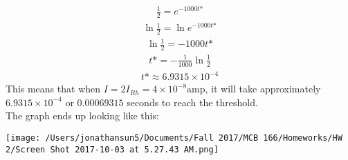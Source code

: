 \documentclass[11pt]{article}
\begin{document}
\begin{enumerate}[label=\arabic*.]
\begin{enumerate}[label=(\alph*)]
\begin{align*}
\frac{1} {2} = e^{-1000 t\text{*}}
\end{align*}
\begin{align*}
\ln{\frac{1} {2}} = \ln{e^{-1000 t\text{*}}}
\end{align*}
\begin{align*}
\ln{\frac{1} {2}} = -1000 t\text{*}
\end{align*}
\begin{align*}
t\text{*} = - \frac{1} {1000} \ln{\frac{1} {2}}
\end{align*}
\begin{align*}
t\text{*} \approx 6.9315 \times 10^{-4}
\end{align*}
This means that when $I = 2 I_{Rh} = 4 \times 10^{-8} \text{amp}$, it will take approximately $6.9315 \times 10^{-4}$ or $0.00069315$ seconds to reach the threshold.
\vspace*{1\baselineskip}
\\
The graph ends up looking like this:
\begin{center}
\texttt{[image: /Users/jonathansun5/Documents/Fall 2017/MCB 166/Homeworks/HW 2/Screen Shot 2017-10-03 at 5.27.43 AM.png]}
\end{center}




\end{enumerate}
\end{enumerate}
\end{document}
